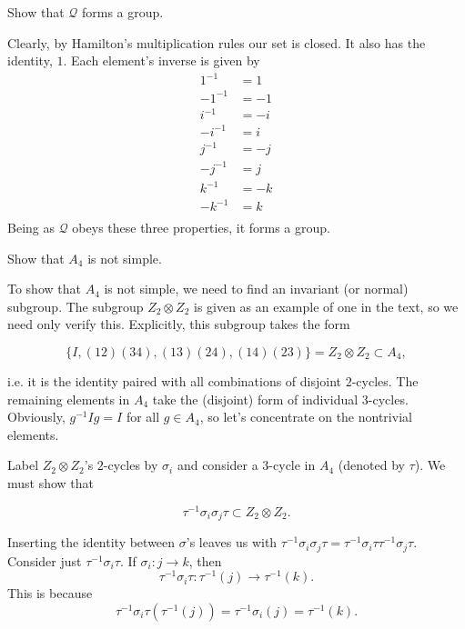 \documentclass[../group-theory-in-a-nutshell-for-physicists.tex]{subfiles}
\begin{document}
\begin{questions}
\question Show that $\mathcal{Q}$ forms a group.

\begin{solution}
Clearly, by Hamilton's multiplication rules our set is closed. It also
has the identity, \(1\). Each element's inverse is given by
\begin{align*}
1^{- 1} & = 1 \\
{- 1}^{- 1} & = {- 1}^{} \\
i^{- 1} & = {- i}^{} \\
{- i}^{- 1} & = i \\
j^{- 1} & = {- j}^{} \\
{- j}^{- 1} & = j \\
k^{- 1} & = {- k}^{} \\
{- k}^{- 1} & = k \\
\end{align*}
Being as $\mathcal{Q}$ obeys these three properties, it forms a group.
\end{solution}

\question Show that $A_{4}$ is not simple.

\begin{solution}
To show that $A_{4}$ is not simple, we need to find an invariant (or
normal) subgroup. The subgroup $Z_{2} \otimes Z_{2}$ is given as an
example of one in the text, so we need only verify this. Explicitly,
this subgroup takes the form

\[
\{ I,(12)(34),(13)(24),(14)(23)\} = Z_{2} \otimes Z_{2} \subset A_{4},
\]

i.e. it is the identity paired with all combinations of disjoint
$2$-cycles. The remaining elements in $A_{4}$ take the (disjoint)
form of individual $3$-cycles. Obviously, $g^{- 1}Ig = I$ for all
$g \in A_{4}$, so let's concentrate on the nontrivial elements.

Label $Z_{2} \otimes Z_{2}$'s $2$-cycles by $\sigma_{i}$ and
consider a $3$-cycle in $A_{4}$ (denoted by $\tau$). We must show
that

\[
	\tau^{- 1}\sigma_{i}\sigma_{j}\tau \subset Z_{2} \otimes Z_{2}.
\]

Inserting the identity between $\sigma$'s leaves us with
$\tau^{- 1}\sigma_{i}\sigma_{j}\tau = \tau^{- 1}\sigma_{i}\tau\tau^{- 1}\sigma_{j}\tau$.
Consider just $\tau^{- 1}\sigma_{i}\tau$. If $\sigma_{i}:j \rightarrow k$, then
\[
\tau^{- 1}\sigma_{i}\tau:\tau^{- 1}(j) \rightarrow \tau^{- 1}(k).
\]
This is because
\[
\tau^{- 1}\sigma_{i}\tau(\tau^{- 1}(j)) = \tau^{- 1}\sigma_{i}(j) = \tau^{- 1}(k).
\]


\end{solution}
\end{questions}
\end{document}
